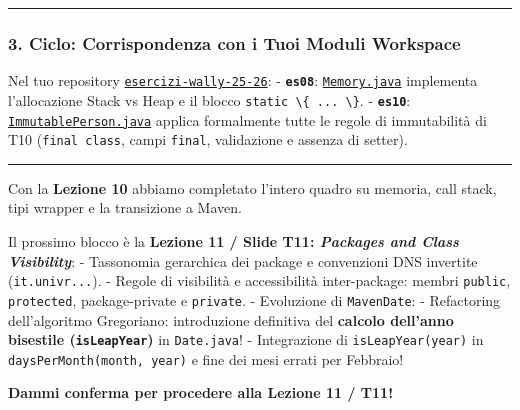 \documentclass[11pt,a4paper]{article}
\newcommand{\passthrough}[1]{#1}
\begin{document}
\begin{center}\rule{0.5\linewidth}{0.5pt}\end{center}

\subsubsection{3. Ciclo: Corrispondenza con i Tuoi Moduli
Workspace}\label{ciclo-corrispondenza-con-i-tuoi-moduli-workspace}

Nel tuo repository
\href{file:///home/wally/Documenti/GitHub/Programmazione-II/25-26/esercizi-wally-25-26}{\passthrough{\lstinline!esercizi-wally-25-26!}}:
- \textbf{\passthrough{\lstinline!es08!}}:
\href{file:///home/wally/Documenti/GitHub/Programmazione-II/25-26/esercizi-wally-25-26/es08/src/main/java/es08/Memory.java}{\passthrough{\lstinline!Memory.java!}}
implementa l'allocazione Stack vs Heap e il blocco
\passthrough{\lstinline!static \{ ... \}!}. -
\textbf{\passthrough{\lstinline!es10!}}:
\href{file:///home/wally/Documenti/GitHub/Programmazione-II/25-26/esercizi-wally-25-26/es10/src/main/java/es10/ImmutablePerson.java}{\passthrough{\lstinline!ImmutablePerson.java!}}
applica formalmente tutte le regole di immutabilità di T10
(\passthrough{\lstinline!final class!}, campi
\passthrough{\lstinline!final!}, validazione e assenza di setter).

\begin{center}\rule{0.5\linewidth}{0.5pt}\end{center}

\begin{studynote} Con la \textbf{Lezione 10} abbiamo completato l'intero
quadro su memoria, call stack, tipi wrapper e la transizione a Maven.

Il prossimo blocco è la \textbf{Lezione 11 / Slide T11: \emph{Packages
and Class Visibility}}: - Tassonomia gerarchica dei package e
convenzioni DNS invertite (\passthrough{\lstinline!it.univr...!}). -
Regole di visibilità e accessibilità inter-package: membri
\passthrough{\lstinline!public!}, \passthrough{\lstinline!protected!},
package-private e \passthrough{\lstinline!private!}. - Evoluzione di
\passthrough{\lstinline!MavenDate!}: - Refactoring dell'algoritmo
Gregoriano: introduzione definitiva del \textbf{calcolo dell'anno
bisestile (\passthrough{\lstinline!isLeapYear!})} in
\passthrough{\lstinline!Date.java!}! - Integrazione di
\passthrough{\lstinline!isLeapYear(year)!} in
\passthrough{\lstinline!daysPerMonth(month, year)!} e fine dei mesi
errati per Febbraio!
\end{studynote}

\textbf{Dammi conferma per procedere alla Lezione 11 / T11!}
\end{document}
